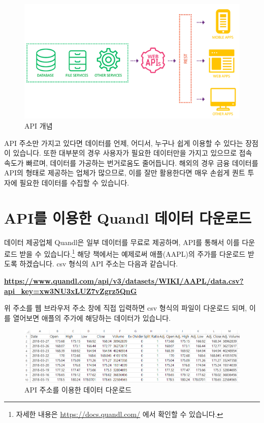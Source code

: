 \documentclass[12pt,]{book}
\let\rmarkdownfootnote\footnote%
\def\footnote{\protect\rmarkdownfootnote}
\begin{document}
\begin{figure}[h]

{\centering \includegraphics[width=0.7\linewidth]{images/api_api} 

}

\caption{API 개념}\label{fig:unnamed-chunk-2}
\end{figure}

API 주소만 가지고 있다면 데이터를 언제, 어디서, 누구나 쉽게 이용할 수 있다는 장점이 있습니다. 또한 대부분의 경우 사용자가 필요한 데이터만을 가지고 있으므로 접속 속도가 빠르며, 데이터를 가공하는 번거로움도 줄어듭니다.
해외의 경우 금융 데이터를 API의 형태로 제공하는 업체가 많으므로, 이를 잘만 활용한다면 매우 손쉽게 퀀트 투자에 필요한 데이터를 수집할 수 있습니다.

\hypertarget{api--quandl--}{%
\section{API를 이용한 Quandl 데이터 다운로드}\label{api--quandl--}}

데이터 제공업체 Quandl은 일부 데이터를 무료로 제공하며, API를 통해서 이를 다운로드 받을 수 있습니다.\footnote{자세한 내용은 \url{https://docs.quandl.com/} 에서 확인할 수 있습니다.} 해당 책에서는 예제로써 애플(AAPL)의 주가를 다운로드 받도록 하겠습니다. csv 형식의 API 주소는 다음과 같습니다.

\textbf{\url{https://www.quandl.com/api/v3/datasets/WIKI/AAPL/data.csv?api_key=xw3NU3xLUZ7vZgrz5QnG}}

위 주소를 웹 브라우저 주소 창에 직접 입력하면 csv 형식의 파일이 다운로드 되며, 이를 열어보면 애플의 주가에 해당하는 데이터가 있습니다.

\begin{figure}[h]

{\centering \includegraphics[width=1\linewidth]{images/api_apple_csv} 

}

\caption{API 주소를 이용한 데이터 다운로드}\label{fig:unnamed-chunk-3}
\end{figure}
\end{document}
